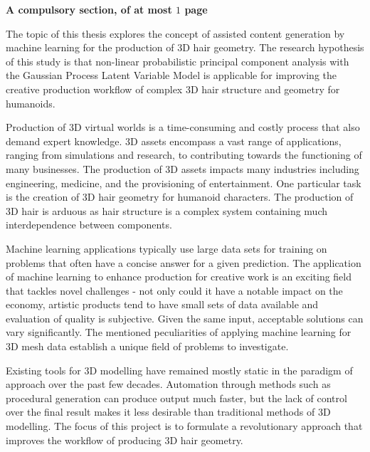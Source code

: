 \documentclass[ %
                    author={Dillon Keith Diep [INCOMPLETE DRAFT, NOT FOR SUBMISSION]},
                supervisor={Dr. Carl Henrik Ek},
                    degree={MEng},
                     title={ART-CG:},
                  subtitle={Assisted Real-Time Content Generation of 3D Hair Geometry},
                      type={Research},
                      year={2014} ]{dissertation}
\begin{document}
{\bf A compulsory section, of at most $1$ page} 
\vspace{1cm} 

\noindent
The topic of this thesis explores the concept of assisted content generation by machine learning for the production of 3D hair geometry. The research hypothesis of this study is that non-linear probabilistic principal component analysis with the Gaussian Process Latent Variable Model is applicable for improving the creative production workflow of complex 3D hair structure and geometry for humanoids.

Production of 3D virtual worlds is a time-consuming and costly process that also demand expert knowledge. 3D assets encompass a vast range of applications, ranging from simulations and research, to contributing towards the functioning of many businesses. The production of 3D assets impacts many industries including engineering, medicine, and the provisioning of entertainment. One particular task is the creation of 3D hair geometry for humanoid characters. The production of 3D hair is arduous as hair structure is a complex system containing much interdependence between components.

Machine learning applications typically use large data sets for training on problems that often have a concise answer for a given prediction. The application of machine learning to enhance production for creative work is an exciting field that tackles novel challenges - not only could it have a notable impact on the economy, artistic products tend to have small sets of data available and evaluation of quality is subjective. Given the same input, acceptable solutions can vary significantly. The mentioned peculiarities of applying machine learning for 3D mesh data establish a unique field of problems to investigate.

Existing tools for 3D modelling have remained mostly static in the paradigm of approach over the past few decades. Automation through methods such as procedural generation can produce output much faster, but the lack of control over the final result makes it less desirable than traditional methods of 3D modelling. The focus of this project is to formulate a revolutionary approach that improves the workflow of producing 3D hair geometry.
\end{document}
